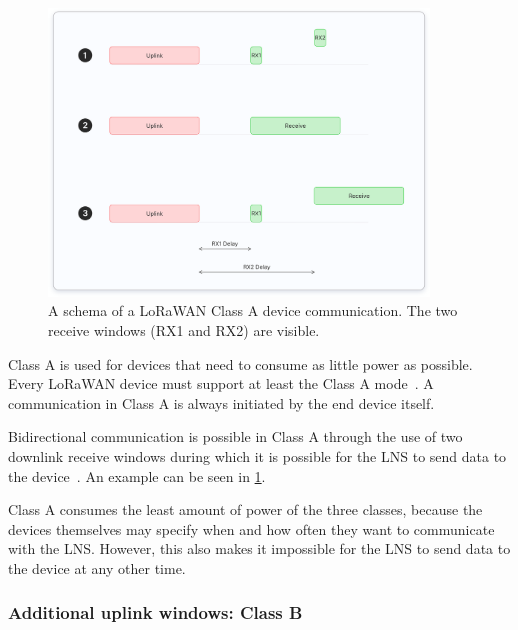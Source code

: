 \begin{figure}[htbp]
    \centering
    \includegraphics[width=0.9\textwidth]{pictures/device-classes/class-a.png}
    \caption{
        A schema of a \ac{LoRaWAN} Class A device communication.
        The two receive windows (RX1 and RX2) are visible.~\protect\cite{the_things_industries_bv_device_nodate}
    }\label{pic:lorawan-device-class-a-schema}
\end{figure}

Class A is used for devices that need to consume as little power as possible.
Every \ac{LoRaWAN} device must support at least the Class A mode~\cite[p. 11]{lora_alliance_inc_lorawan_specification_2017}.
A communication in Class A is always initiated by the end device itself.

Bidirectional communication is possible in Class A through the use of two downlink receive windows during which it is possible for the \ac{LNS} to send data to the device~\cite[p. 13]{lora_alliance_inc_lorawan_specification_2017}.
An example can be seen in \cref{pic:lorawan-device-class-a-schema}.

Class A consumes the least amount of power of the three classes, because the devices themselves may specify when and how often they want to communicate with the \ac{LNS}.
However, this also makes it impossible for the \ac{LNS} to send data to the device at any other time.

\subsubsection{Additional uplink windows: Class B}

